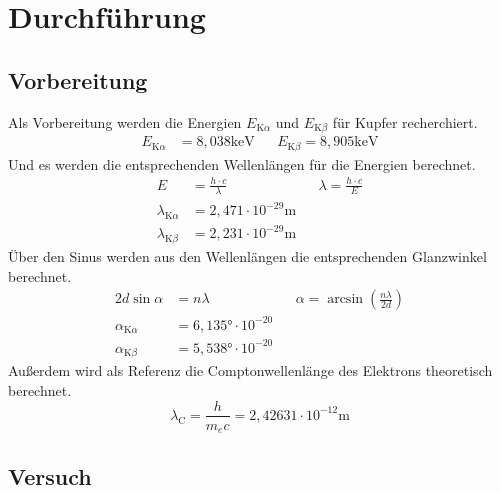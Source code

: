 \section{Durchführung}
\label{sec:Durchfuehrung}
\subsection{Vorbereitung}
Als Vorbereitung werden die Energien $E_{\text{K}\alpha}$ und $E_{\text{K}\beta}$ für Kupfer recherchiert.
\begin{align}
    E_{\text{K}\alpha} &= 8,038\text{keV}    &&   E_{\text{K}\beta} = 8,905\text{keV} \label{eqn:EnergieKupfer}
\end{align}
Und es werden die entsprechenden Wellenlängen für die Energien berechnet.
\begin{align}
    E &= \frac{h\cdot c}{\lambda} && \lambda = \frac{h\cdot c}{E} \nonumber \\
    \lambda_{\text{K}\alpha} &= 2,471\cdot 10^{-29} \text{m} \\
    \lambda_{\text{K}\beta} &= 2,231 \cdot 10^{-29} \text{m} 
\end{align}
Über den Sinus werden aus den Wellenlängen die entsprechenden Glanzwinkel berechnet.
\begin{align}
   2d\sin{\alpha} &= n\lambda && \alpha = \arcsin \left(\frac{n\lambda}{2d}\right) \nonumber \\
   \alpha_{\text{K}\alpha} &= 6,135° \cdot 10^{-20} \\
   \alpha_{\text{K}\beta} &= 5,538° \cdot 10^{-20}
\end{align}
Außerdem wird als Referenz die Comptonwellenlänge des Elektrons theoretisch berechnet.
\begin{equation}
    \lambda_{\text{C}} = \frac{h}{m_e c} = 2,42631 \cdot 10^{-12} \text{m}
\end{equation}



\subsection{Versuch}

